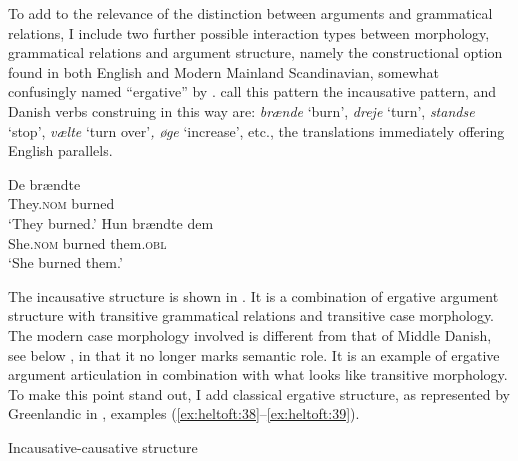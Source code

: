\documentclass[output=paper]{langscibook}
\begin{document}
To add to the relevance of the distinction between arguments and grammatical relations, I include two further possible interaction types between morphology, grammatical relations and argument structure, namely the constructional option found in both English and Modern Mainland Scandinavian, somewhat confusingly named ``ergative'' by \citet{Halliday1968, Halliday1994}. \citet{HansenHeltoft2011} call this pattern the incausative pattern, and Danish verbs construing in this way are: \textit{brænde} ‘burn', \textit{dreje} ‘turn', \textit{standse} ‘stop', \textit{vælte} ‘turn over'\textit{, øge} ‘increase', etc., the translations immediately offering English parallels.

\ea \label{ex:heltoft:37} 
\ea 
    \gll De            brændte \\
    They.\textsc{nom}      burned\\
    \glt `They burned.' \label{ex:heltoft:37a}
\ex \label{ex:heltoft:37b}
    \gll Hun        brændte    dem\\
    She.\textsc{nom} burned      them.\textsc{obl}  \\
    \glt `She burned them.'
\z\z

The incausative structure is shown in . It is a combination of ergative argument structure with transitive grammatical relations and transitive case morphology. The modern case morphology  involved is different from that of Middle Danish, see below , in that it no longer marks semantic role. It is an example of ergative argument articulation in combination with what looks like transitive morphology. To make this point stand out, I add classical ergative structure, as represented by Greenlandic in , examples (\ref{ex:heltoft:38}--\ref{ex:heltoft:39}). 

\begin{table}\small\captionsetup{margin=.025\linewidth}
\begin{floatrow}
{\caption{Incausative-causative structure\label{tab:heltoft:6}}}

{\caption{Ergative constructional typology\label{tab:heltoft:7}}}
\end{floatrow}
\end{table}
\end{document}
